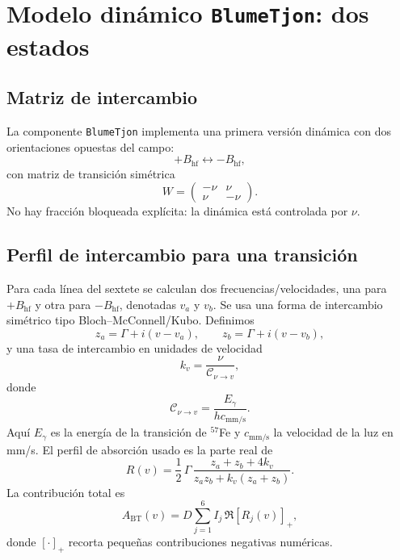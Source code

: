\documentclass[11pt,a4paper]{article}
\newcommand{\BHF}{B_{\mathrm{hf}}}
\newcommand{\code}[1]{\texttt{\small #1}}
\begin{document}
\section{Modelo dinámico \code{BlumeTjon}: dos estados}

\subsection{Matriz de intercambio}

La componente \code{BlumeTjon} implementa una primera versión dinámica con dos
orientaciones opuestas del campo:
\begin{equation}
  +\BHF \leftrightarrow -\BHF,
\end{equation}
con matriz de transición simétrica
\begin{equation}
  W=\begin{pmatrix}-\nu & \nu\\ \nu & -\nu\end{pmatrix}.
\end{equation}
No hay fracción bloqueada explícita: la dinámica está controlada por $\nu$.

\subsection{Perfil de intercambio para una transición}

Para cada línea del sextete se calculan dos frecuencias/velocidades, una para
$+\BHF$ y otra para $-\BHF$, denotadas $v_a$ y $v_b$. Se usa una forma de
intercambio simétrico tipo Bloch--McConnell/Kubo. Definimos
\begin{equation}
  z_a = \Gamma + i(v-v_a),\qquad z_b = \Gamma + i(v-v_b),
\end{equation}
y una tasa de intercambio en unidades de velocidad
\begin{equation}
  k_v = \frac{\nu}{\mathcal{C}_{\nu\to v}},
\end{equation}
donde
\begin{equation}
  \mathcal{C}_{\nu\to v}=\frac{E_\gamma}{h c_{\mathrm{mm/s}}}.
\end{equation}
Aquí $E_\gamma$ es la energía de la transición de $^{57}$Fe y
$c_{\mathrm{mm/s}}$ la velocidad de la luz en mm/s. El perfil de absorción usado
es la parte real de
\begin{equation}
  R(v)=\frac{1}{2}\,\Gamma\,
  \frac{z_a+z_b+4k_v}{z_a z_b+k_v(z_a+z_b)}.
  \label{eq:exchange}
\end{equation}
La contribución total es
\begin{equation}
  A_{\mathrm{BT}}(v)=D\sum_{j=1}^{6} I_j\,\Re\left[R_j(v)\right]_+,
\end{equation}
donde $[\cdot]_+$ recorta pequeñas contribuciones negativas numéricas.
\end{document}

